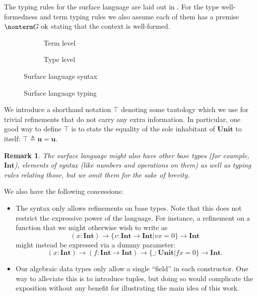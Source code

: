 \documentclass[a4paper]{article}
\newtheorem{remark}{Remark}
\newcommand{\unit}{\textbf{u}}
\newcommand{\Unit}{\textbf{Unit}}
\newcommand{\Int}{\textbf{Int}}
\newcommand{\ctxok}{\text{~ok}}
\begin{document}
The typing rules for the surface language are laid out in .
For the type well-formedness and term typing rules
we also assume each of them has a premise $\nonterm G \ctxok$
stating that the context is well-formed.

\begin{figure}[ht]
  \footnotesize
  \begin{subfigure}{.6\textwidth}
    \caption{Term level}
  \end{subfigure}
  \begin{subfigure}{.5\textwidth}
    \caption{Type level}
  \end{subfigure}
  \caption{Surface language syntax}
  \label{fig:surface_syntax}
\end{figure}

\begin{figure}[ht]
  \footnotesize
  \drules[TCTX]{$\nonterm G \ctxok$}{context well-formedness}{Empty,Bind}
  \caption{Surface language typing}
  \label{fig:surface_typing}
\end{figure}

We introduce a shorthand notation $\top$ denoting some tautology
which we use for trivial refinements that do not carry any extra information.
In particular, one good way to define $\top$ is
to state the equality of the sole inhabitant of $\Unit$ to itself:
$\top \triangleq \unit = \unit$.

\begin{remark}\label{remark:surface_base_types}
  The surface language might also have other base types (for example, $\Int$),
  elements of syntax (like numbers and operations on them)
  as well as typing rules relating those,
  but we omit them for the sake of brevity.
\end{remark}

We also have the following concessions:
\begin{itemize}
  \item The syntax only allows refinements on base types.
    Note that this does not restrict the expressive power of the language.
    For instance, a refinement on a function that we might otherwise wish to write as
    \[
      (x : \Int) \rightarrow \{ v : \Int \rightarrow \Int | v x = 0 \} \rightarrow \Int
    \]
    might instead be expressed via a dummy parameter:
    \[
      (x : \Int) \rightarrow (f : \Int \rightarrow \Int) \rightarrow \{ \_ : \Unit | f x = 0 \} \rightarrow \Int.
    \]
  \item Our algebraic data types only allow a single ``field'' in each constructor.
    One way to alleviate this is to introduce tuples,
    but doing so would complicate the exposition
    without any benefit for illustrating the main idea of this work.
\end{itemize}
\end{document}
